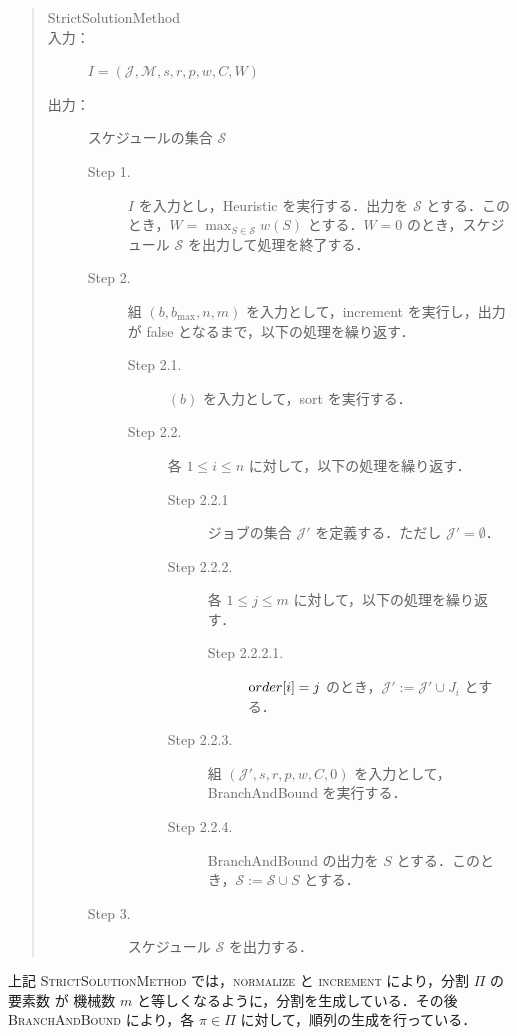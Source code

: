 \documentclass[12pt]{optlab-bachelor}
\begin{document}
\begin{quote}
  \begin{description}
    \item[{\sc StrictSolutionMethod}]
    \item[入力：] $I = (\mathcal{J},\mathcal{M},s,r,p,w,C,W)$
    \item[出力：] スケジュールの集合 $\mathcal{S}$
    \begin{description}
      \item[Step 1.] $I$ を入力とし，{\sc Heuristic} を実行する．出力を $\mathcal{S}$ とする．このとき，$W = {\displaystyle \max_{S \in \mathcal{S}}w(S)}$ とする．$W = 0$ のとき，スケジュール $\mathcal{S}$ を出力して処理を終了する．
      \item[Step 2.] 組 $(b,b_{\max},n,m)$ を入力として，{\sc increment} を実行し，出力が {\sc false} となるまで，以下の処理を繰り返す．
      \begin{description}
        \item[Step 2.1.] $(b)$ を入力として，{\sc sort} を実行する．
        \item[Step 2.2.] 各 $1 \le i \le n$ に対して，以下の処理を繰り返す．
        \begin{description}
          \item[Step 2.2.1] ジョブの集合 $\mathcal{J}'$ を定義する．ただし $\mathcal{J}' = \emptyset$．
          \item[Step 2.2.2.] 各 $1 \le j \le m$ に対して，以下の処理を繰り返す．
          \begin{description}
            \item[Step 2.2.2.1.] ${\mbox order}[i] = j$ のとき，$\mathcal{J}' :=\mathcal{J}' \cup J_i$ とする．
          \end{description}
          \item[Step 2.2.3.] 組 $(\mathcal{J}',s,r,p,w,C,0)$ を入力として，{\sc BranchAndBound} を実行する．
          \item[Step 2.2.4.] {\sc BranchAndBound} の出力を $S$ とする．このとき，$\mathcal{S} := \mathcal{S} \cup S$ とする．
        \end{description}
      \end{description}
      \item[Step 3.] スケジュール $\mathcal{S}$ を出力する．
    \end{description}
  \end{description}
\end{quote}

上記 \textsc{StrictSolutionMethod} では，\textsc{normalize} と \textsc{increment} により，分割 $\Pi$ の要素数 が 機械数 $m$ と等しくなるように，分割を生成している．その後 \textsc{BranchAndBound} により，各 $\pi \in \Pi$ に対して，順列の生成を行っている．
\end{document}
